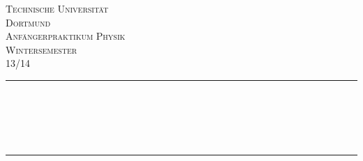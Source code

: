 \begin{titlepage}

\begin{center}

\vspace*{2cm}

\textsc{\LARGE Technische Universität\\ Dortmund}\\[1.5cm]

\textsc{\Large Anfängerpraktikum Physik\\ Wintersemester \\ 13/14}\\[0.5cm]


\newcommand{\HRule}{\rule{\linewidth}{0.5mm}}
\HRule \\[0.4cm]
{ \huge \bfseries \VNr }\\[0.2cm]
{ \huge \bfseries \VN }\\[0.5cm]
{\large \VD}\\

\HRule \\[1.5cm]

\begin{minipage}{0.4\textwidth}
\begin{flushleft} \large
\Namen
\end{flushleft}
\end{minipage}
\hfill
\begin{minipage}{0.4\textwidth}
\begin{flushright} \large
\Emails
\end{flushright}
\end{minipage}

\vfill



\end{center}

\end{titlepage}